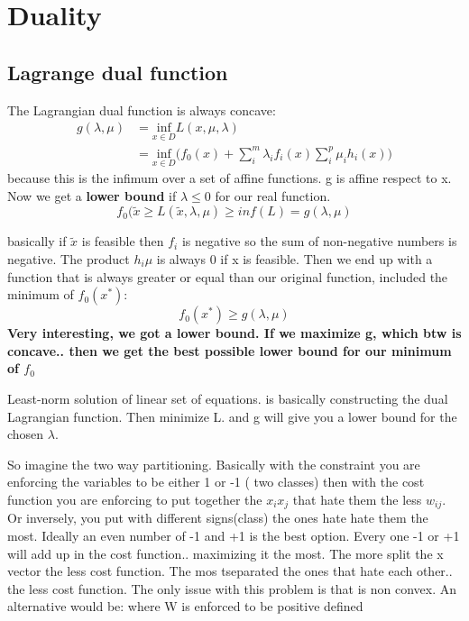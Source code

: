 \section{Duality}

\subsection{Lagrange dual function}

The Lagrangian dual function is always concave:
\begin{equation}
\begin{aligned}
g(\lambda,\mu) &= \underset{x \in D}{\text{inf}} L(x,\mu,\lambda)\\
&=\underset{x \in D}{\text{inf}}\Big(f_0(x) + \sum_i^m \lambda_i f_i(x) \sum_i^p\mu_i h_i(x)\Big)
\end{aligned}
\end{equation}
because this is the infimum over a set of affine functions. g is affine respect to x.
Now we get a \textbf{lower bound} if $\lambda \leq 0$ for our real function. 
$$f_0(\tilde{x} \geq L(\tilde{x}, \lambda, \mu) \geq inf(L) = g(\lambda,\mu) $$

basically if $\tilde{x}$ is feasible then $f_i$ is negative so the sum of non-negative numbers is negative. The product $h_i\mu$ is always 0 if x is feasible. Then we end up with a function that is always greater or equal than our original function, included the minimum of $f_0(x^*)$:
$$f_0(x^*)\geq g(\lambda,\mu)$$
\textbf{Very interesting, we got a lower bound. If we maximize g, which btw is concave.. then we get the best possible lower bound for our minimum of $f_0$}

Least-norm solution of linear set of equations. 
is basically constructing the dual Lagrangian function. Then minimize L. and g will give you a lower bound for the chosen $\lambda$.

So imagine the two way partitioning.
Basically with the constraint you are enforcing the variables to be either 1 or -1 ( two classes) then with the cost function you are enforcing to put together the $x_ix_j$ that hate them the less $w_{ij}$. Or inversely, you put with different signs(class) the ones hate hate them the most. Ideally an even number of -1 and +1 is the best option. Every one -1 or +1 will add up in the cost function.. maximizing it the most. The more split the x vector the less cost function. The mos tseparated the ones that hate each other.. the less cost function. The only issue with this problem is that is non convex. An alternative would be:
where W is enforced to be positive defined

